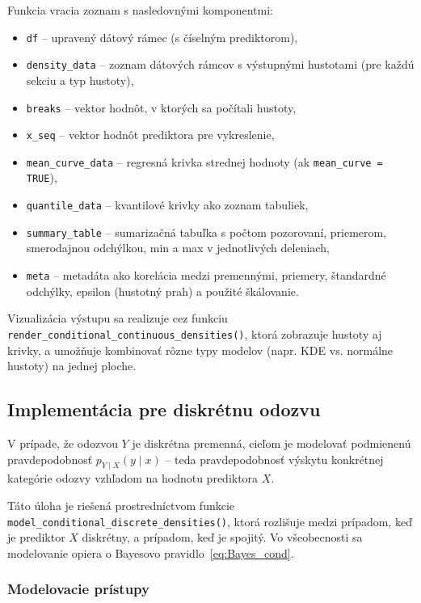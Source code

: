 Funkcia vracia zoznam s nasledovnými komponentmi:

\begin{itemize}
\setlength{\itemsep}{0pt}
  \setlength{\parskip}{0pt}
  \item \texttt{df} – upravený dátový rámec (s číselným prediktorom),
  \item \texttt{density\_data} – zoznam dátových rámcov s výstupnými hustotami (pre každú sekciu a typ hustoty),
  \item \texttt{breaks} – vektor hodnôt, v ktorých sa počítali hustoty,
  \item \texttt{x\_seq} – vektor hodnôt prediktora pre vykreslenie,
  \item \texttt{mean\_curve\_data} – regresná krivka strednej hodnoty (ak \texttt{mean\_curve = TRUE}),
  \item \texttt{quantile\_data} – kvantilové krivky ako zoznam tabuliek,
  \item \texttt{summary\_table} – sumarizačná tabuľka s počtom pozorovaní, priemerom, smerodajnou odchýlkou, min a max v jednotlivých deleniach,
  \item \texttt{meta} – metadáta ako korelácia medzi premennými, priemery, štandardné odchýlky, epsilon (hustotný prah) a použité škálovanie.
\end{itemize}

Vizualizácia výstupu sa realizuje cez funkciu \texttt{render\_conditional\_continuous\_densities()}, ktorá zobrazuje hustoty aj krivky, a umožňuje kombinovať rôzne typy modelov (napr. KDE vs. normálne hustoty) na jednej ploche.

\subsection{Implementácia pre diskrétnu odozvu}

V prípade, že odozvou $Y$ je diskrétna premenná, cieľom je modelovať podmienenú pravdepodobnosť $p_{Y \mid X}(y \mid x)$ – teda pravdepodobnosť výskytu konkrétnej kategórie odozvy vzhľadom na hodnotu prediktora $X$. 

Táto úloha je riešená prostredníctvom funkcie \texttt{model\_conditional\_discrete\_densities()}, ktorá rozlišuje medzi prípadom, keď je prediktor $X$ diskrétny, a prípadom, keď je spojitý. Vo všeobecnosti sa modelovanie opiera o Bayesovo pravidlo~\ref{eq:Bayes_cond}.

\subsubsection{Modelovacie prístupy}

